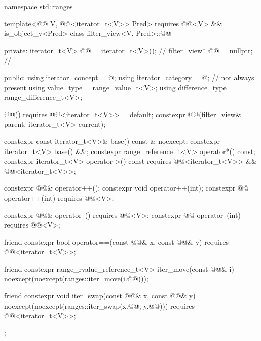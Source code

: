 %
%
\begin{codeblock}
namespace std::ranges {
  template<@@ V, @@<iterator_t<V>> Pred>
    requires @@<V> && is_object_v<Pred>
  class filter_view<V, Pred>::@@ {
  private:
    iterator_t<V> @@ = iterator_t<V>();   // \expos
    filter_view* @@ = nullptr;             // \expos

  public:
    using iterator_concept  = @\seebelownc@;
    using iterator_category = @\seebelownc@;        // not always present
    using value_type        = range_value_t<V>;
    using difference_type   = range_difference_t<V>;

    @@() requires @@<iterator_t<V>> = default;
    constexpr @@(filter_view& parent, iterator_t<V> current);

    constexpr const iterator_t<V>& base() const & noexcept;
    constexpr iterator_t<V> base() &&;
    constexpr range_reference_t<V> operator*() const;
    constexpr iterator_t<V> operator->() const
      requires @@<iterator_t<V>> && @@<iterator_t<V>>;

    constexpr @@& operator++();
    constexpr void operator++(int);
    constexpr @@ operator++(int) requires @@<V>;

    constexpr @@& operator--() requires @@<V>;
    constexpr @@ operator--(int) requires @@<V>;

    friend constexpr bool operator==(const @@& x, const @@& y)
      requires @@<iterator_t<V>>;

    friend constexpr range_rvalue_reference_t<V> iter_move(const @@& i)
      noexcept(noexcept(ranges::iter_move(i.@@)));

    friend constexpr void iter_swap(const @@& x, const @@& y)
      noexcept(noexcept(ranges::iter_swap(x.@@, y.@@)))
      requires @@<iterator_t<V>>;
  };
}
\end{codeblock}

